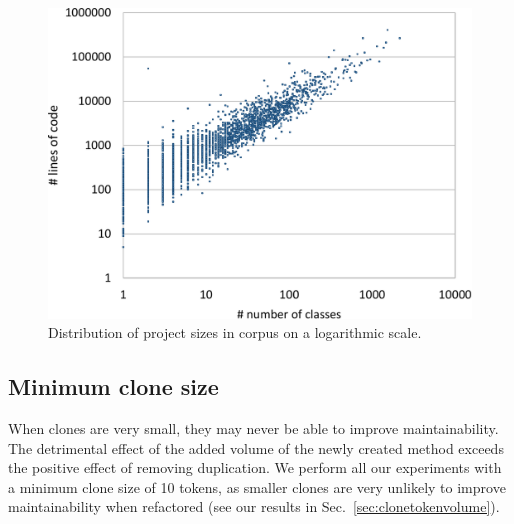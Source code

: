 \documentclass[sigconf,review,anonymous]{acmart}
\begin{document}
\begin{figure}
  \includegraphics[width=1\columnwidth]{img/dist2}
  \caption{Distribution of project sizes in corpus on a logarithmic scale.}
  \label{fig:dist}
\end{figure}


\subsection{Minimum clone size}
When clones are very small, they may never be able to improve maintainability. The detrimental effect of the added volume of the newly created method exceeds the positive effect of removing duplication. We perform all our experiments with a minimum clone size of 10 tokens, as smaller clones are very unlikely to improve maintainability when refactored (see our results in Sec.~\ref{sec:clonetokenvolume}).

\end{document}

